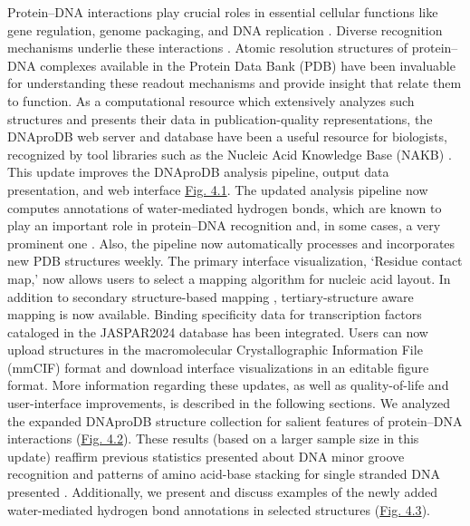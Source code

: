 Protein–DNA interactions play crucial roles in essential cellular functions like gene regulation, genome packaging, and DNA replication \citep{Spitz2012, Lai2017}. Diverse recognition mechanisms underlie these interactions \citep{rohs2009role, Rohs2010, Kitayner2010, Chiu2023}. Atomic resolution structures of protein–DNA complexes available in the Protein Data Bank (PDB) \citep{wwpdb2019protein} have been invaluable for understanding these readout mechanisms and provide insight that relate them to function. As a computational resource which extensively analyzes such structures and presents their data in publication-quality representations, the DNAproDB web server \citep{Sagendorf2017} and database \citep{Sagendorf2020} have been a useful resource for biologists, recognized by tool libraries such as the Nucleic Acid Knowledge Base (NAKB) \citep{Lawson2024}. 
This update improves the DNAproDB analysis pipeline, output data presentation, and web interface \hyperref[fig:dnaprodb1]{Fig. 4.1}. The updated analysis pipeline now computes annotations of water-mediated hydrogen bonds, which are known to play an important role \citep{Reddy2001} in protein–DNA recognition and, in some cases, a very prominent one \citep{Otwinowski1988}. Also, the pipeline now automatically processes and incorporates new PDB structures weekly. The primary interface visualization, ‘Residue contact map,’ now allows users to select a mapping algorithm for nucleic acid layout. In addition to secondary structure-based mapping \citep{Lorenz2011}, tertiary-structure aware mapping \citep{Mitra2024rnascape} is now available. Binding specificity data for transcription factors cataloged in the JASPAR2024 \citep{Rauluseviciute2024} database has been integrated. Users can now upload structures in the macromolecular Crystallographic Information File (mmCIF) format and download interface visualizations in an editable figure format. More information regarding these updates, as well as quality-of-life and user-interface improvements, is described in the following sections.
We analyzed the expanded DNAproDB structure collection for salient features of protein–DNA interactions (\hyperref[fig:dnaprodb2]{Fig. 4.2}). These results (based on a larger sample size in this update) reaffirm previous statistics presented about DNA minor groove recognition \citep{rohs2009role} and patterns of amino acid-base stacking for single stranded DNA presented \citep{Sagendorf2020}. Additionally, we present and discuss examples of the newly added water-mediated hydrogen bond annotations in selected structures (\hyperref[fig:dnaprodb3]{Fig. 4.3}).
